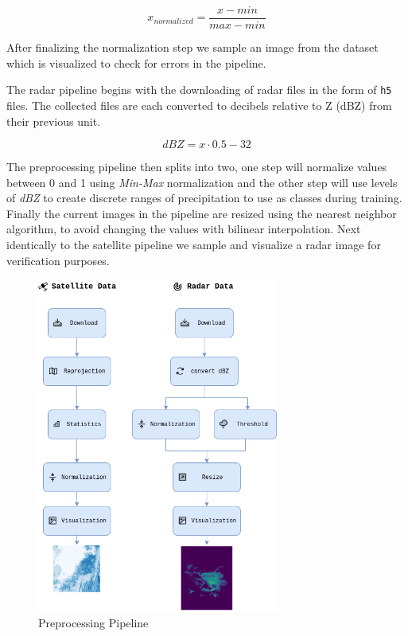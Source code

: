 \documentclass[acmtog, authorversion]{acmart}
\begin{document}
\begin{equation}
  x_{normalized} = \frac{x-min}{max-min}  
\end{equation}

After finalizing the normalization step we sample an image from the dataset which is visualized to check for errors in the pipeline.

The radar pipeline begins with the downloading of radar files in the form of \texttt{h5} files. The collected files are each converted to decibels relative to Z (dBZ) from their previous unit.

\begin{equation}
  dBZ = x \cdot 0.5 - 32
\end{equation}

The preprocessing pipeline then splits into two, one step will normalize values between 0 and 1 using \textit{Min-Max} normalization and the other step will use levels of \textit{dBZ} to create discrete ranges of precipitation to use as classes during training.
Finally the current images in the pipeline are resized using the nearest neighbor algorithm, to avoid changing the values with bilinear interpolation.
Next identically to the satellite pipeline we sample and visualize a radar image for verification purposes.


\begin{figure}
  \centering
  \includegraphics[width=225pt]{./images/preprocessing.png}
  \caption{Preprocessing Pipeline}
  \label{fig:preprocessing}
\end{figure}
\end{document}
